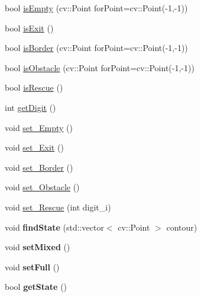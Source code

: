 \begin{DoxyCompactItemize}
\item 
bool \mbox{\hyperlink{class_cell_a5175d1bb16d2192ecfcb6e7c0a962389}{is\+Empty}} (cv\+::\+Point for\+Point=cv\+::\+Point(-\/1,-\/1))
\item 
bool \mbox{\hyperlink{class_cell_aaf13f5d308c7f1eb670a050e4fc6dc28}{is\+Exit}} ()
\item 
bool \mbox{\hyperlink{class_cell_adebbc4bba0795d564ec275ea32edb525}{is\+Border}} (cv\+::\+Point for\+Point=cv\+::\+Point(-\/1,-\/1))
\item 
bool \mbox{\hyperlink{class_cell_a8c505bb81ec2fbbb68ffb3d022c43b10}{is\+Obstacle}} (cv\+::\+Point for\+Point=cv\+::\+Point(-\/1,-\/1))
\item 
bool \mbox{\hyperlink{class_cell_ad86a719c04ff04bdf79c1c0b8e5a5942}{is\+Rescue}} ()
\item 
int \mbox{\hyperlink{class_cell_a335c410074aaac9bb5594ea8adf648ff}{get\+Digit}} ()
\item 
void \mbox{\hyperlink{class_cell_a8e990447fa7c048d0246ee88640b5060}{set\+\_\+\+Empty}} ()
\item 
void \mbox{\hyperlink{class_cell_a0d8dcfcd6f3f40ce6179cf8fed4694ec}{set\+\_\+\+Exit}} ()
\item 
void \mbox{\hyperlink{class_cell_aaf2c6b0f530432a4a2b47fbbf45c8ba0}{set\+\_\+\+Border}} ()
\item 
void \mbox{\hyperlink{class_cell_af7d43434293cf3df61c07b95af4c3be6}{set\+\_\+\+Obstacle}} ()
\item 
void \mbox{\hyperlink{class_cell_a9fbed46923e15b7c576b438017ba0673}{set\+\_\+\+Rescue}} (int digit\+\_\+i)
\item 
\mbox{\label{class_cell_a4eb2375f1aaf905bffe8c7c57e3379d4}} 
void {\bfseries find\+State} (std\+::vector$<$ cv\+::\+Point $>$ contour)
\item 
\mbox{\label{class_cell_ab26739a1fdd5763ff71f5362b986eae4}} 
void {\bfseries set\+Mixed} ()
\item 
\mbox{\label{class_cell_a1d31bcdf9696327e370853e552135c74}} 
void {\bfseries set\+Full} ()
\item 
\mbox{\label{class_cell_aeee51c3aeab485978aa70293806b6021}} 
bool {\bfseries get\+State} ()
\item 
\mbox{\label{class_cell_a4c23ccef6e17cb341ca494933e195eac}} 

\end{DoxyCompactItemize}
